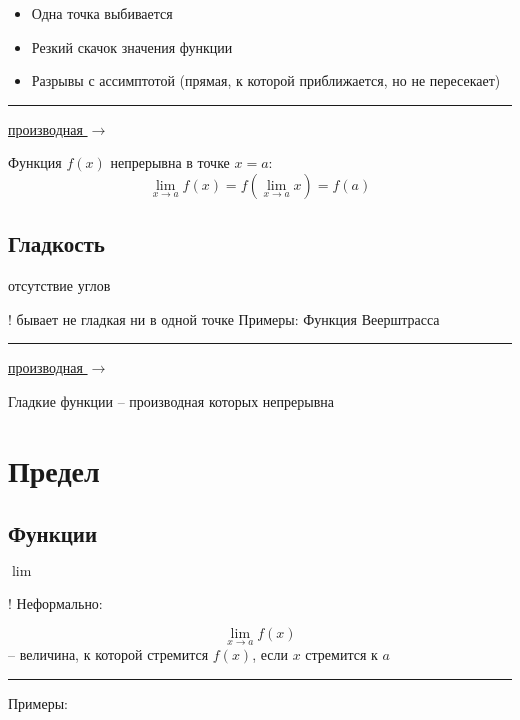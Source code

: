 \documentclass{article}
\begin{document}
\begin{itemize}
    \item Одна точка выбивается
    \item Резкий скачок значения функции
    \item Разрывы с ассимптотой (прямая, к которой приближается, но не пересекает)
\end{itemize}

\noindent\rule{\textwidth}{1pt}

\hyperref[section:derivative]{производная $\to$}

Функция $f(x)$ непрерывна в точке $x=a$: $$\lim_{x \to a} f(x) = f(\lim_{x \to a} x) = f(a)$$

\subsection{Гладкость}
отсутствие углов

! бывает не гладкая ни в одной точке
Примеры:
Функция Веерштрасса

\noindent\rule{\textwidth}{1pt}

\hyperref[section:derivative]{производная $\to$}

Гладкие функции -- производная которых непрерывна


\section{Предел}
\label{section:limit}
\subsection{Функции}
$\lim_{}$

! Неформально:

$$\lim_{x \to a} f(x)$$ -- величина, к которой стремится $f(x)$, если $x$ стремится к $a$

\noindent\rule{\textwidth}{1pt}

Примеры:
\end{document}
